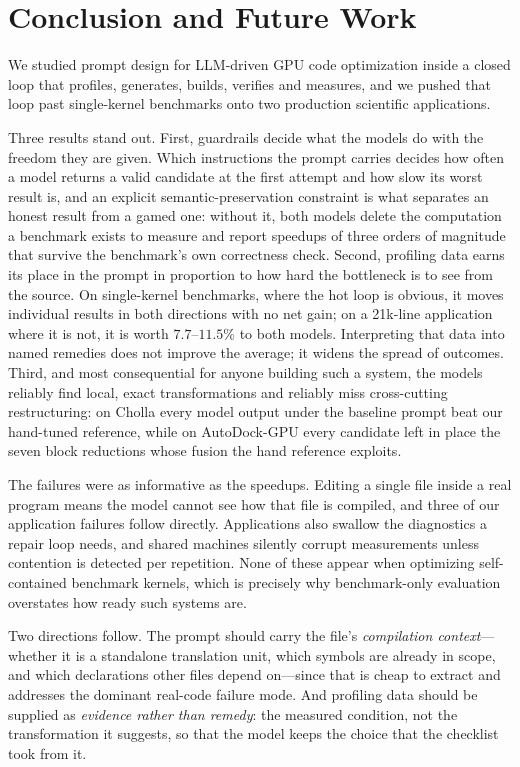 \section{Conclusion and Future Work}
\label{sec:conclusions}
We studied prompt design for LLM-driven GPU code optimization inside a closed loop that profiles,
generates, builds, verifies and measures, and we pushed that loop past single-kernel benchmarks onto
two production scientific applications.

Three results stand out. First, guardrails decide what the models do with the freedom they are given.
Which instructions the prompt carries decides how often a model returns a valid candidate at the first
attempt and how slow its worst result is, and an explicit semantic-preservation constraint is what
separates an honest result from a gamed one: without it, both models delete the computation a
benchmark exists to measure and report speedups of three orders of magnitude that survive the
benchmark's own correctness check. Second, profiling data earns its place in the prompt in proportion
to how hard the bottleneck is to see from the source. On single-kernel benchmarks, where the hot loop
is obvious, it moves individual results in both directions with no net gain; on a 21k-line application
where it is not, it is worth $7.7$--$11.5\%$ to both models. Interpreting that data into named
remedies does not improve the average; it widens the spread of outcomes. Third, and most consequential
for anyone building such a system, the models reliably find local, exact transformations and reliably
miss cross-cutting restructuring: on Cholla every model output under the baseline prompt beat our
hand-tuned reference, while on AutoDock-GPU every candidate left in place the seven block reductions
whose fusion the hand reference exploits.

The failures were as informative as the speedups. Editing a single file inside a real program means the
model cannot see how that file is compiled, and three of our application failures follow directly.
Applications also swallow the diagnostics a repair loop needs, and shared machines silently corrupt
measurements unless contention is detected per repetition. None of these appear when optimizing
self-contained benchmark kernels, which is precisely why benchmark-only evaluation overstates how ready
such systems are.

Two directions follow. The prompt should carry the file's \emph{compilation context}---whether it is a
standalone translation unit, which symbols are already in scope, and which declarations other files
depend on---since that is cheap to extract and addresses the dominant real-code failure mode. And
profiling data should be supplied as \emph{evidence rather than remedy}: the measured condition,
not the transformation it suggests, so that the model keeps the choice that the checklist took from
it.
